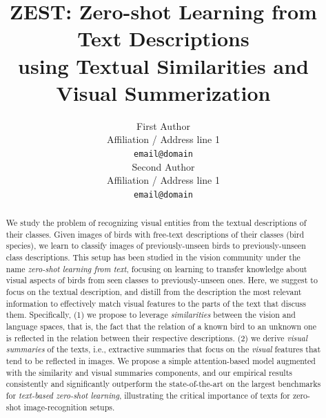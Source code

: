 \documentclass[11pt,a4paper]{article}
\title{ZEST: Zero-shot Learning from Text Descriptions\\ %
using Textual Similarities and Visual Summerization}
\author{First Author \\
  Affiliation / Address line 1 \\
  \texttt{email@domain} \\\And
  Second Author \\
  Affiliation / Address line 1 \\
  \texttt{email@domain} \\}
\date{}
\begin{document}
\maketitle
\begin{abstract}



We study the problem of recognizing visual entities from the textual descriptions of their classes. Given images of birds with free-text descriptions of their classes (bird species), we learn to classify images of previously-unseen birds to   previously-unseen class descriptions. This setup has been studied in the vision community under the name {\em zero-shot learning from text}, focusing on learning to transfer knowledge about visual aspects of birds from seen classes to previously-unseen ones. Here, we suggest to focus on the textual description, 
%
and distill from the description the most relevant information to effectively match visual features to the parts of the text that discuss them. 
Specifically,  %
(1) we propose to leverage {\em similarities} between the vision and language spaces, that is,  the fact that %
the relation of a known bird to an unknown one is reflected in the relation between their respective descriptions. 
(2) we derive {\em visual summaries} of the texts, i.e.,  %
extractive summaries that focus on the {\em visual} features that tend to be reflected in images.
We propose a simple attention-based model augmented with   the  similarity and visual summaries components, and our empirical results  consistently and significantly outperform the state-of-the-art on the largest benchmarks for {\em text-based zero-shot learning}, illustrating the critical importance of texts for zero-shot image-recognition setups.




\end{abstract}
\end{document}
